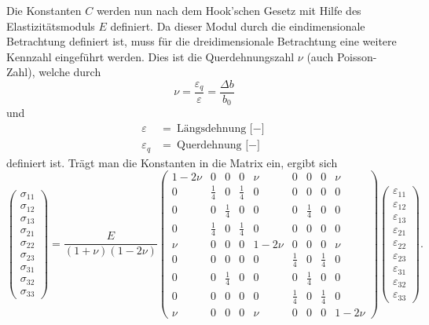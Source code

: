 Die Konstanten $C$ werden nun nach dem Hook'schen Gesetz mit Hilfe des Elastizitätsmoduls $E$ definiert.
Da dieser Modul durch die eindimensionale Betrachtung definiert ist,
muss für die dreidimensionale Betrachtung eine weitere Kennzahl eingeführt werden.
Dies ist die Querdehnungszahl $\nu$ (auch Poisson-Zahl), welche durch
\[
\nu
=
\frac{\varepsilon_q}{\varepsilon}
=
\frac{\Delta b}{b_0}
\]
und
\begin{align*}
	\varepsilon     &= \text{Längsdehnung [$-$]} \\
	\varepsilon_q   &= \text{Querdehnung [$-$]}
\end{align*}
definiert ist. Trägt man die Konstanten in die Matrix ein, ergibt sich
\[
\begin{pmatrix}
	\sigma_{11}\\
	\sigma_{12}\\
	\sigma_{13}\\
	\sigma_{21}\\
	\sigma_{22}\\
	\sigma_{23}\\
	\sigma_{31}\\
	\sigma_{32}\\
	\sigma_{33}
\end{pmatrix}
=
\frac{E}{(1+\nu)(1-2\nu)}
\begin{pmatrix}
	1-2\nu &          0 &          0 &          0 &    \nu &          0 &          0 &          0 & \nu   \\
	     0 &\frac{1}{4} &          0 &\frac{1}{4} &      0 &          0 &          0 &          0 & 0     \\
	     0 &          0 &\frac{1}{4} &          0 &      0 &          0 &\frac{1}{4} &          0 & 0     \\
	     0 &\frac{1}{4} &          0 &\frac{1}{4} &      0 &          0 &          0 &          0 & 0     \\
	   \nu &          0 &          0 &          0 & 1-2\nu &          0 &          0 &          0 & \nu   \\
  	     0 &          0 &          0 &          0 &      0 &\frac{1}{4} &          0 &\frac{1}{4} & 0     \\
	     0 &          0 &\frac{1}{4} &          0 &      0 &          0 &\frac{1}{4} &          0 & 0     \\
	     0 &          0 &          0 &          0 &      0 &\frac{1}{4} &          0 &\frac{1}{4} & 0     \\
	   \nu &          0 &          0 &          0 &    \nu &          0 &          0 &          0 & 1-2\nu
\end{pmatrix}
\begin{pmatrix}
	\varepsilon_{11} \\
	\varepsilon_{12} \\
	\varepsilon_{13} \\
	\varepsilon_{21} \\
	\varepsilon_{22} \\
	\varepsilon_{23} \\
	\varepsilon_{31} \\
	\varepsilon_{32} \\
	\varepsilon_{33}
\end{pmatrix}
.
\]
